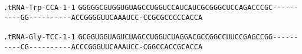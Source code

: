 \documentclass{article}
\newcommand{\rnabox}[1]{\colorbox{#1}{\texttt{#1}}}
\begin{document}
\vspace{-0.5mm}

\texttt{.tRNA-Trp-CCA-1-1}
\rnabox{G}\rnabox{G}\rnabox{G}\rnabox{G}\rnabox{G}\rnabox{C}\rnabox{G}\rnabox{U}\rnabox{G}\rnabox{G}\rnabox{U}\rnabox{G}\rnabox{U}\rnabox{A}\rnabox{G}\rnabox{C}\rnabox{C}\rnabox{U}\rnabox{G}\rnabox{G}\rnabox{U}\rnabox{C}\rnabox{C}\rnabox{A}\rnabox{U}\rnabox{C}\rnabox{A}\rnabox{U}\rnabox{C}\rnabox{G}\rnabox{C}\rnabox{G}\rnabox{G}\rnabox{G}\rnabox{C}\rnabox{U}\rnabox{C}\rnabox{C}\rnabox{A}\rnabox{G}\rnabox{A}\rnabox{C}\rnabox{C}\rnabox{C}\rnabox{G}\rnabox{C}\rnabox{-}\rnabox{-}\rnabox{-}\rnabox{-}\rnabox{-}\rnabox{-}\rnabox{-}\rnabox{-}\rnabox{-}\rnabox{-}\rnabox{G}\rnabox{G}\rnabox{-}\rnabox{-}\rnabox{-}\rnabox{-}\rnabox{-}\rnabox{-}\rnabox{-}\rnabox{-}\rnabox{-}\rnabox{-}\rnabox{A}\rnabox{C}\rnabox{C}\rnabox{G}\rnabox{G}\rnabox{G}\rnabox{G}\rnabox{U}\rnabox{U}\rnabox{C}\rnabox{A}\rnabox{A}\rnabox{A}\rnabox{U}\rnabox{C}\rnabox{C}\rnabox{-}\rnabox{C}\rnabox{C}\rnabox{G}\rnabox{C}\rnabox{G}\rnabox{C}\rnabox{C}\rnabox{C}\rnabox{C}\rnabox{C}\rnabox{A}\rnabox{C}\rnabox{C}\rnabox{A}

\vspace{-0.5mm}

\texttt{.tRNA-Gly-TCC-1-1}
\rnabox{G}\rnabox{C}\rnabox{G}\rnabox{G}\rnabox{U}\rnabox{G}\rnabox{G}\rnabox{U}\rnabox{A}\rnabox{G}\rnabox{U}\rnabox{C}\rnabox{U}\rnabox{A}\rnabox{G}\rnabox{C}\rnabox{C}\rnabox{U}\rnabox{G}\rnabox{G}\rnabox{U}\rnabox{C}\rnabox{U}\rnabox{A}\rnabox{G}\rnabox{G}\rnabox{A}\rnabox{C}\rnabox{G}\rnabox{C}\rnabox{C}\rnabox{G}\rnabox{G}\rnabox{C}\rnabox{C}\rnabox{U}\rnabox{U}\rnabox{C}\rnabox{C}\rnabox{G}\rnabox{A}\rnabox{G}\rnabox{C}\rnabox{C}\rnabox{G}\rnabox{G}\rnabox{-}\rnabox{-}\rnabox{-}\rnabox{-}\rnabox{-}\rnabox{-}\rnabox{-}\rnabox{-}\rnabox{-}\rnabox{-}\rnabox{C}\rnabox{G}\rnabox{-}\rnabox{-}\rnabox{-}\rnabox{-}\rnabox{-}\rnabox{-}\rnabox{-}\rnabox{-}\rnabox{-}\rnabox{-}\rnabox{A}\rnabox{C}\rnabox{C}\rnabox{C}\rnabox{G}\rnabox{G}\rnabox{G}\rnabox{U}\rnabox{U}\rnabox{C}\rnabox{A}\rnabox{A}\rnabox{A}\rnabox{U}\rnabox{C}\rnabox{C}\rnabox{-}\rnabox{C}\rnabox{G}\rnabox{G}\rnabox{C}\rnabox{C}\rnabox{A}\rnabox{C}\rnabox{C}\rnabox{G}\rnabox{C}\rnabox{A}\rnabox{C}\rnabox{C}\rnabox{A}

\vspace{-0.5mm}
\end{document}
